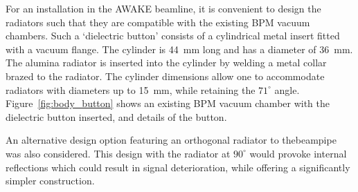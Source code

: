 For an installation in the AWAKE beamline, it is convenient to design the radiators such that they are compatible with the existing BPM vacuum chambers. Such a `dielectric button' consists of a cylindrical metal insert fitted with a vacuum flange. The cylinder is 44~mm long and has a diameter of 36~mm. The alumina radiator is inserted into the cylinder by welding a metal collar brazed to the radiator. The cylinder dimensions allow one to accommodate radiators with diameters up to 15~mm, while retaining the $71^\circ$ angle. Figure~\ref{fig:body_button} shows an existing BPM vacuum chamber with the dielectric button inserted, and details of the button. 


An alternative design option featuring an orthogonal radiator to the\linebreak beampipe was also considered. This design with the radiator at $90^\circ$ would provoke internal reflections which could result in signal deterioration, while offering a significantly simpler construction. 




